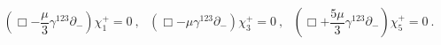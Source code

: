 \begin{equation}
( \Box - \frac{\mu}{3} \gamma^{123} \partial_- )
     \chi^+_1 = 0 ~,~~~
( \Box - \mu \gamma^{123} \partial_- )
     \chi^+_3 = 0 ~,~~~
( \Box + \frac{5 \mu}{3} \gamma^{123} \partial_- )
     \chi^+_5 = 0 ~.
\end{equation}

